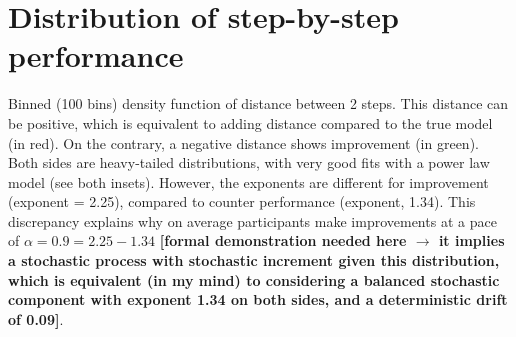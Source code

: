 \section{Distribution of step-by-step performance}

Binned (100 bins) density function of distance between 2 steps. This distance can be positive, which is equivalent to adding distance compared to the true model (in red). On the contrary, a negative distance shows improvement (in green). Both sides are heavy-tailed distributions, with very good fits with a power law model (see both insets). However, the exponents are different for improvement (exponent = 2.25), compared to counter performance (exponent, 1.34). This discrepancy explains why on average participants make improvements at a pace of $\alpha = 0.9 = 2.25 - 1.34$ {\bf [formal demonstration needed here $\rightarrow$ it implies a stochastic process with stochastic increment given this distribution, which is equivalent (in my mind) to considering a balanced stochastic component with exponent 1.34 on both sides, and a deterministic drift of 0.09]}. 